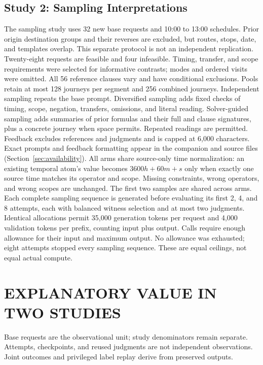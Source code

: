 \documentclass[a4paper,twoside]{article}
\begin{document}
\subsection{Study 2: Sampling Interpretations}

The sampling study uses 32 new base requests and 10:00 to 13:00 schedules. Prior origin destination groups and their reverses are excluded, but routes, stops, date, and templates overlap. This separate protocol is not an independent replication. Twenty-eight requests are feasible and four infeasible. Timing, transfer, and scope requirements were selected for informative contrasts; modes and ordered visits were omitted. All 56 reference clauses vary and have conditional exclusions. Pools retain at most 128 journeys per segment and 256 combined journeys.
Independent sampling repeats the base prompt. Diversified sampling adds fixed checks of timing, scope, negation, transfers, omissions, and literal reading. Solver-guided sampling adds summaries of prior formulas and their full and clause signatures, plus a concrete journey when space permits. Repeated readings are permitted. Feedback excludes references and judgments and is capped at 6,000 characters. Exact prompts and feedback formatting appear in the companion and source files (Section~\ref{sec:availability}). All arms share source-only time normalization: an existing temporal atom's value becomes $3600h+60m+s$ only when exactly one source time matches its operator and scope. Missing constraints, wrong operators, and wrong scopes are unchanged.
The first two samples are shared across arms. Each complete sampling sequence is generated before evaluating its first 2, 4, and 8 attempts, each with balanced witness selection and at most two judgments. Identical allocations permit 35,000 generation tokens per request and 4,000 validation tokens per prefix, counting input plus output. Calls require enough allowance for their input and maximum output. No allowance was exhausted; eight attempts stopped every sampling sequence. These are equal ceilings, not equal actual compute.



\section{\uppercase{Explanatory Value in Two Studies}}
\label{sec:findings}

\noindent Base requests are the observational unit; study denominators remain separate. Attempts, checkpoints, and reused judgments are not independent observations. Joint outcomes and privileged label replay derive from preserved outputs.
\end{document}
